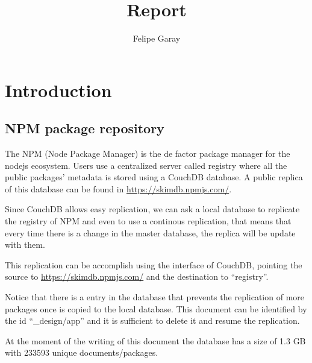 \documentclass[letterpaper,12pt]{report}
\title{Report}
\author{Felipe Garay}
\begin{document}
\maketitle
\newpage
\tableofcontents
\newpage


\chapter{Introduction}




\section{NPM package repository}

The NPM (Node Package Manager) is the de factor package manager for the nodejs
ecosystem. Users use a centralized server called registry where all the public
packages' metadata is stored using a CouchDB database. A public replica of this
database can be found in \url{https://skimdb.npmjs.com/}.

Since CouchDB allows easy replication, we can ask a local database to replicate
the registry of NPM and even to use a continous replication, that means that
every time there is a change in the master database, the replica will be update
with them.

This replication can be accomplish using the interface of CouchDB, pointing the
source to \url{https://skimdb.npmjs.com/} and the destination to ``registry''.

Notice that there is a entry in the database that prevents the replication of
more packages once is copied to the local database. This document can be
identified by the id ``\_design/app'' and it is sufficient to delete it and
resume the replication.

At the moment of the writing of this document the database has a size of 1.3 GB
with 233593	unique documents/packages.
\end{document}
